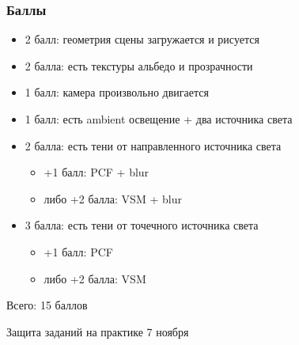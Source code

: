 \documentclass{beamer}
\begin{document}
\begin{frame}[fragile]
\frametitle{Баллы}
\begin{itemize}
\item 2 балл: геометрия сцены загружается и рисуется
\item 2 балла: есть текстуры альбедо и прозрачности
\item 1 балл: камера произвольно двигается
\item 1 балл: есть ambient освещение + два источника света
\item 2 балла: есть тени от направленного источника света
\begin{itemize}
\item +1 балл: PCF + blur
\item либо +2 балла: VSM + blur
\end{itemize}
\item 3 балла: есть тени от точечного источника света
\begin{itemize}
\item +1 балл: PCF
\item либо +2 балла: VSM
\end{itemize}
\end{itemize}
Всего: 15 баллов

Защита заданий на практике 7 ноября
\end{frame}
\end{document}
